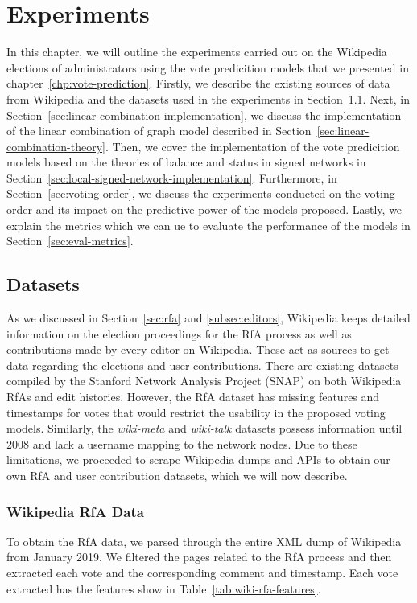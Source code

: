 \chapter{Experiments}
\label{chp:experiments}
In this chapter, we will outline the experiments carried out on the Wikipedia elections of administrators using the vote predicition models that we presented in chapter~\ref{chp:vote-prediction}.
Firstly, we describe the existing sources of data from Wikipedia and the datasets used in the experiments in Section~\ref{sec:datasets}.
Next, in Section~\ref{sec:linear-combination-implementation}, we discuss the implementation of the linear combination of graph model described in Section~\ref{sec:linear-combination-theory}.
Then, we cover the implementation of the vote predicition models based on the theories of balance and status in signed networks in Section~\ref{sec:local-signed-network-implementation}.
Furthermore, in Section~\ref{sec:voting-order}, we discuss the experiments conducted on the voting order and its impact on the predictive power of the models proposed.
Lastly, we explain the metrics which we can ue to evaluate the performance of the models in Section~\ref{sec:eval-metrics}.


\section{Datasets}
\label{sec:datasets}
As we discussed in Section~\ref{sec:rfa} and \ref{subsec:editors}, Wikipedia keeps detailed information on the election proceedings for the RfA process as well as contributions made by every editor on Wikipedia.
These act as sources to get data regarding the elections and user contributions. There are existing datasets compiled by the Stanford Network Analysis Project (SNAP) \cite{snapnets} on both Wikipedia RfAs and edit histories.
However, the RfA dataset has missing features and timestamps for votes that would restrict the usability in the proposed voting models.
Similarly, the \textit{wiki-meta} and \textit{wiki-talk} datasets possess information until 2008 and lack a username mapping to the network nodes.
Due to these limitations, we proceeded to scrape Wikipedia dumps and APIs to obtain our own RfA and user contribution datasets, which we will now describe.

\subsection{Wikipedia RfA Data}
To obtain the RfA data, we parsed through the entire XML dump of Wikipedia from January 2019.
We filtered the pages related to the RfA process and then extracted each vote and the corresponding comment and timestamp.
Each vote extracted has the features show in Table~\ref{tab:wiki-rfa-features}.

